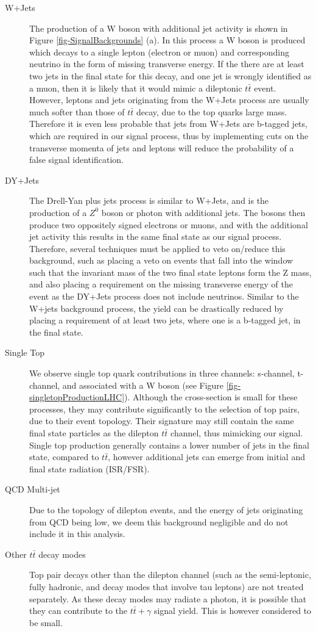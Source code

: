 \begin{description}
	\item[W+Jets] The production of a W boson with additional jet activity is shown in Figure \ref{fig-SignalBackgrounds} (a). In this process a W boson is produced which decays to a single lepton (electron or muon) and corresponding neutrino in the form of missing transverse energy. If the there are at least two jets in the final state for this decay, and one jet is wrongly identified as a muon, then it is likely that it would mimic a dileptonic $t\bar{t}$ event. However, leptons and jets originating from the W+Jets process are usually much softer than those of $t\bar{t}$ decay, due to the top quarks large mass. Therefore it is even less probable that jets from W+Jets are b-tagged jets, which are required in our signal process, thus by implementing cuts on the transverse momenta of jets and leptons will reduce the probability of a false signal identification.  
	\item[DY+Jets] The Drell-Yan plus jets process is similar to W+Jets, and is the production of a $Z^0$ boson or photon with additional jets. The bosons then produce two oppositely signed electrons or muons, and with the additional jet activity this results in the same final state as our signal process. Therefore, several techniques must be applied to veto on/reduce this background, such as placing a veto on events that fall into the window such that the invariant mass of the two final state leptons form the Z mass, and also placing a requirement on the missing transverse energy of the event as the DY+Jets process does not include neutrinos. Similar to the W+jets background process, the yield can be drastically reduced by placing a requirement of at least two jets, where one is a b-tagged jet, in the final state. 
	\item[Single Top] We observe single top quark contributions in three channels: s-channel, t-channel, and associated with a W boson (see Figure \ref{fig-singletopProductionLHC}). Although the cross-section is small for these processes, they may contribute significantly to the selection of top pairs, due to their event topology. Their signature may still contain the same final state particles as the dilepton $t\bar{t}$ channel, thus mimicking our signal. Single top production generally contains a lower number of jets in the final state, compared to $t\bar{t}$, however additional jets can emerge from initial and final state radiation (ISR/FSR).  
	\item[QCD Multi-jet] Due to the topology of dilepton events, and the energy of jets originating from QCD being low, we deem this background negligible and do not include it in this analysis. 
	\item[Other $t\bar{t}$ decay modes] Top pair decays other than the dilepton channel (such as the semi-leptonic, fully hadronic, and decay modes that involve tau leptons) are not treated separately. As these decay modes may radiate a photon, it is possible that they can contribute to the $t\bar{t}+\gamma$ signal yield. This is however considered to be small.  
\end{description}

